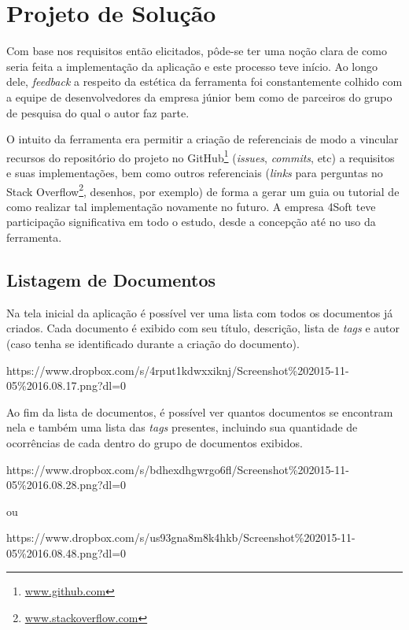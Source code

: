 \chapter{Projeto de Solução}

Com base nos requisitos então elicitados, pôde-se ter uma noção clara de como seria feita a implementação da aplicação e este processo teve início. Ao longo dele, \textit{feedback} a respeito da estética da ferramenta foi constantemente colhido com a equipe de desenvolvedores da empresa júnior bem como de parceiros do grupo de pesquisa do qual o autor faz parte.

O intuito da ferramenta era permitir a criação de referenciais de modo a vincular recursos do repositório do projeto no GitHub\footnote{\url{www.github.com}} (\textit{issues}, \textit{commits}, etc) a requisitos e suas implementações, bem como outros referenciais (\textit{links} para perguntas no Stack Overflow\footnote{\url{www.stackoverflow.com}}, desenhos, por exemplo) de forma a gerar um guia ou tutorial de como realizar tal implementação novamente no futuro. A empresa 4Soft teve participação significativa em todo o estudo, desde a concepção até no uso da ferramenta.


\section{Listagem de Documentos}

Na tela inicial da aplicação é possível ver uma lista com todos os documentos já criados. Cada documento é exibido com seu título, descrição, lista de \textit{tags} e autor (caso tenha se identificado durante a criação do documento).

https://www.dropbox.com/s/4rput1kdwxxiknj/Screenshot\%202015-11-05\%2016.08.17.png?dl=0

Ao fim da lista de documentos, é possível ver quantos documentos se encontram nela e também uma lista das \textit{tags} presentes, incluindo sua quantidade de ocorrências de cada dentro do grupo de documentos exibidos.

https://www.dropbox.com/s/bdhexdhgwrgo6fl/Screenshot\%202015-11-05\%2016.08.28.png?dl=0

ou

https://www.dropbox.com/s/us93gna8m8k4hkb/Screenshot\%202015-11-05\%2016.08.48.png?dl=0

